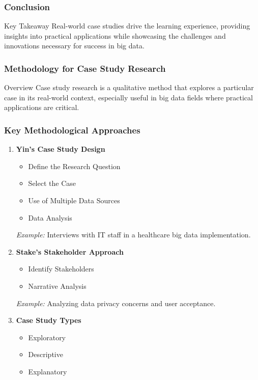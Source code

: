\documentclass[aspectratio=169]{beamer}
\begin{document}
\begin{frame}[fragile]
    \frametitle{Conclusion}
    \begin{block}{Key Takeaway}
        Real-world case studies drive the learning experience, providing insights into practical applications while showcasing the challenges and innovations necessary for success in big data.
    \end{block}
\end{frame}

\begin{frame}[fragile]
    \frametitle{Methodology for Case Study Research}
    \begin{block}{Overview}
        Case study research is a qualitative method that explores a particular case in its real-world context, especially useful in big data fields where practical applications are critical.
    \end{block}
\end{frame}

\begin{frame}[fragile]
    \frametitle{Key Methodological Approaches}
    \begin{enumerate}
        \item \textbf{Yin’s Case Study Design}
            \begin{itemize}
                \item Define the Research Question
                \item Select the Case
                \item Use of Multiple Data Sources
                \item Data Analysis
            \end{itemize}
            \textit{Example:} Interviews with IT staff in a healthcare big data implementation.
        
        \item \textbf{Stake’s Stakeholder Approach}
            \begin{itemize}
                \item Identify Stakeholders
                \item Narrative Analysis
            \end{itemize}
            \textit{Example:} Analyzing data privacy concerns and user acceptance.
        
        \item \textbf{Case Study Types}
            \begin{itemize}
                \item Exploratory
                \item Descriptive
                \item Explanatory
            \end{itemize}
    \end{enumerate}
\end{frame}
\end{document}
